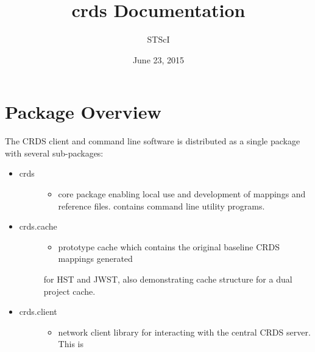 \documentclass[letterpaper,10pt,english]{sphinxmanual}
\title{crds Documentation}
\date{June 23, 2015}
\author{STScI}
\begin{document}
\maketitle
\tableofcontents
{}\label{index::doc}



\chapter{Package Overview}
\label{installation:package-overview}\label{installation:crds-user-manual}\label{installation::doc}
The CRDS client and command line software is distributed as a single package with
several sub-packages:
\begin{itemize}
\item {} \begin{description}
\item[{crds}] \leavevmode\begin{itemize}
\item {} 
core package enabling local use and development of mappings
and reference files.  contains command line utility programs.

\end{itemize}

\end{description}

\item {} \begin{description}
\item[{crds.cache}] \leavevmode\begin{itemize}
\item {} 
prototype cache which contains the original baseline CRDS mappings generated

\end{itemize}

for HST and JWST,  also demonstrating cache structure for a dual project cache.

\end{description}

\item {} \begin{description}
\item[{crds.client}] \leavevmode\begin{itemize}
\item {} 
network client library for interacting with the central CRDS server.  This is

\end{itemize}


\end{description}
\end{itemize}
\end{document}
